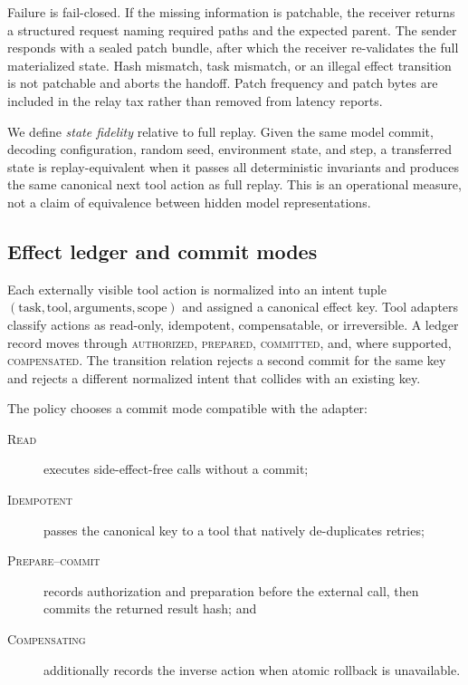 \documentclass[10pt]{article}
\newcommand{\methodtag}[1]{\textsc{#1}}
\begin{document}
Failure is fail-closed. If the missing information is patchable, the receiver
returns a structured request naming required paths and the expected parent.
The sender responds with a sealed patch bundle, after which the receiver
re-validates the full materialized state. Hash mismatch, task mismatch, or an
illegal effect transition is not patchable and aborts the handoff. Patch
frequency and patch bytes are included in the relay tax rather than removed
from latency reports.

We define \emph{state fidelity} relative to full replay. Given the same model
commit, decoding configuration, random seed, environment state, and step,
a transferred state is replay-equivalent when it passes all deterministic
invariants and produces the same canonical next tool action as full replay.
This is an operational measure, not a claim of equivalence between hidden
model representations.

\subsection{Effect ledger and commit modes}
\label{sec:ledger}

Each externally visible tool action is normalized into an intent tuple
$(\mathrm{task},\mathrm{tool},\mathrm{arguments},\mathrm{scope})$ and assigned
a canonical effect key. Tool adapters classify actions as read-only,
idempotent, compensatable, or irreversible. A ledger record moves through
\textsc{authorized}, \textsc{prepared}, \textsc{committed}, and, where
supported, \textsc{compensated}. The transition relation rejects a second
commit for the same key and rejects a different normalized intent that
collides with an existing key.

The policy chooses a commit mode compatible with the adapter:
\begin{description}
  \item[\methodtag{Read}] executes side-effect-free calls without a commit;
  \item[\methodtag{Idempotent}] passes the canonical key to a tool that
  natively de-duplicates retries;
  \item[\methodtag{Prepare--commit}] records authorization and preparation
  before the external call, then commits the returned result hash; and
  \item[\methodtag{Compensating}] additionally records the inverse action
  when atomic rollback is unavailable.
\end{description}
\end{document}
